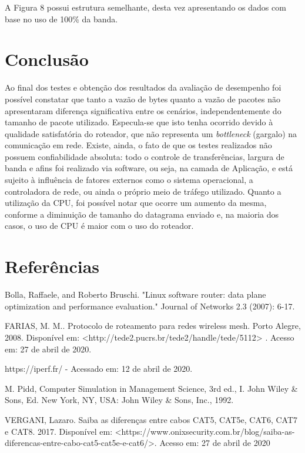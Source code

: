 \documentclass[12pt]{article}
\begin{document}
A Figura 8 possui estrutura semelhante, desta vez apresentando os dados com base no uso de 100\% da banda.

\section{Conclusão}

Ao final dos testes e obtenção dos resultados da avaliação de desempenho foi possível constatar que tanto a vazão de bytes quanto a vazão de pacotes não apresentaram diferença significativa entre os cenários, independentemente do tamanho de pacote utilizado. 
Especula-se que isto tenha ocorrido devido à qualidade satisfatória do roteador, que não representa um  \textit{bottleneck} (gargalo) na comunicação em rede. Existe, ainda, o fato de que os testes realizados não possuem confiabilidade absoluta: todo o controle de transferências, largura de banda e afins foi realizado via software, ou seja, na camada de Aplicação, e está sujeito à influência de fatores externos como o sistema operacional, a controladora de rede, ou ainda o próprio meio de tráfego utilizado.
Quanto a utilização da CPU, foi possível notar que ocorre um aumento da mesma, conforme a diminuição de tamanho do datagrama enviado e, na maioria dos casos, o uso de CPU é maior com o uso do roteador.

\section{Referências}

Bolla, Raffaele, and Roberto Bruschi. "Linux software router: data plane optimization and performance evaluation." Journal of Networks 2.3 (2007): 6-17.

FARIAS, M. M.. Protocolo de roteamento para redes wireless mesh. Porto Alegre, 2008. Disponível em: <http://tede2.pucrs.br/tede2/handle/tede/5112> . Acesso em: 27 de abril de 2020.

https://iperf.fr/ - Acessado em: 12 de abril de 2020.

M. Pidd, Computer Simulation in Management Science, 3rd ed., I. John Wiley \& Sons, Ed. New York, NY, USA: John Wiley \& Sons, Inc., 1992.

VERGANI, Lazaro. Saiba as diferenças entre cabos CAT5, CAT5e, CAT6, CAT7 e CAT8. 2017. Disponível em: <https://www.onixsecurity.com.br/blog/saiba-as-diferencas-entre-cabo-cat5-cat5e-e-cat6/>. Acesso em: 27 de abril de 2020

%
%
\end{document}

